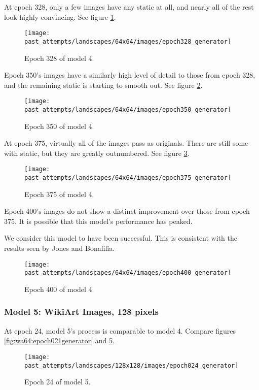 \documentclass[11pt,letterpaper]{article}
\begin{document}
				At epoch 328, only a few images have any static at all, and nearly all of the rest look highly convincing.
				See figure \ref{fig:wa64:epoch328generator}.
				\begin{figure}
					\centering
					\texttt{[image: past\_attempts/landscapes/64x64/images/epoch328\_generator]}
					\caption{Epoch 328 of model 4.}
					\label{fig:wa64:epoch328generator}
				\end{figure}

				Epoch 350's images have a similarly high level of detail to those from epoch 328, and the remaining static is starting to smooth out.
				See figure \ref{fig:wa64:epoch350generator}.
				\begin{figure}
					\centering
					\texttt{[image: past\_attempts/landscapes/64x64/images/epoch350\_generator]}
					\caption{Epoch 350 of model 4.}
					\label{fig:wa64:epoch350generator}
				\end{figure}

				At epoch 375, virtually all of the images pass as originals.
				There are still some with static, but they are greatly outnumbered.
				See figure \ref{fig:wa64:epoch375generator}.
				\begin{figure}
					\centering
					\texttt{[image: past\_attempts/landscapes/64x64/images/epoch375\_generator]}
					\caption{Epoch 375 of model 4.}
					\label{fig:wa64:epoch375generator}
				\end{figure}

				Epoch 400's images do not show a distinct improvement over those from epoch 375.
				It is possible that this model's performance has peaked.

				We consider this model to have been successful.
				This is consistent with the results seen by Jones and Bonafilia\cite{otherGanGogh}.
				\begin{figure}
					\centering
					\texttt{[image: past\_attempts/landscapes/64x64/images/epoch400\_generator]}
					\caption{Epoch 400 of model 4.}
					\label{fig:wa64:epoch400generator}
				\end{figure}
			\subsubsection{Model 5: WikiArt Images, 128 pixels}
				At epoch 24, model 5's process is comparable to model 4.
				Compare figures \ref{fig:wa64:epoch021generator} and \ref{fig:wa128:epoch024generator}.
				\begin{figure}
					\centering
					\texttt{[image: past\_attempts/landscapes/128x128/images/epoch024\_generator]}
					\caption{Epoch 24 of model 5.}
					\label{fig:wa128:epoch024generator}
				\end{figure}
\end{document}
